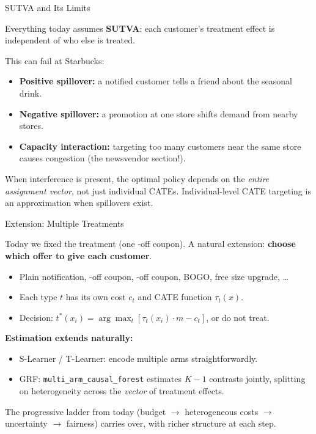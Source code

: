 \documentclass[aspectratio=169, 11pt, handout]{beamer}
\begin{document}
 
\begin{frame}{SUTVA and Its Limits}
 
Everything today assumes \textbf{SUTVA}: each customer's treatment effect is independent of who else is treated.
 
\bigskip
 
This can fail at Starbucks:
\begin{itemize}
    \item \textbf{Positive spillover:} a notified customer tells a friend about the seasonal drink.
    \item \textbf{Negative spillover:} a promotion at one store shifts demand from nearby stores.
    \item \textbf{Capacity interaction:} targeting too many customers near the same store causes congestion (the newsvendor section!).
\end{itemize}
 
\pause
\bigskip
 
When interference is present, the optimal policy depends on the \emph{entire assignment vector}, not just individual CATEs. Individual-level CATE targeting is an approximation when spillovers exist.
 
\end{frame}
 
 
\begin{frame}{Extension: Multiple Treatments}
 
Today we fixed the treatment (one -off coupon). A natural extension: \textbf{choose which offer to give each customer}.
 
\bigskip
 
\begin{itemize}
    \item Plain notification, -off coupon, -off coupon, BOGO, free size upgrade, \ldots
    \item Each type $t$ has its own cost $c_t$ and CATE function $\tau_t(x)$.
    \item Decision: $t^*(x_i) = \arg\max_t [\tau_t(x_i) \cdot m - c_t]$, or do not treat.
\end{itemize}
 
\pause
\bigskip
 
\textbf{Estimation extends naturally:}
\begin{itemize}
    \item S-Learner / T-Learner: encode multiple arms straightforwardly.
    \item GRF: \texttt{multi\_arm\_causal\_forest} estimates $K-1$ contrasts jointly, splitting on heterogeneity across the \emph{vector} of treatment effects.
\end{itemize}
 
\pause
\bigskip
 
The progressive ladder from today (budget $\to$ heterogeneous costs $\to$ uncertainty $\to$ fairness) carries over, with richer structure at each step.
 
\end{frame}
 
\end{document}
